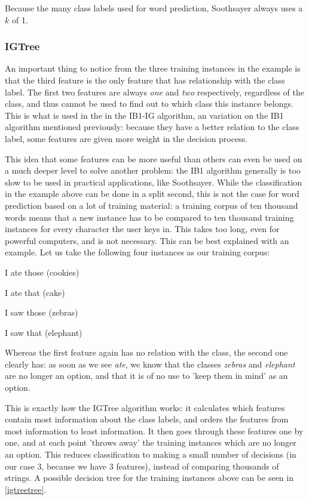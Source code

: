 \documentclass[12pt]{article}
\begin{document}
Because the many class labels used for word prediction, Soothsayer always uses a $k$ of 1.

\subsubsection{IGTree}

An important thing to notice from the three training instances in the example is that the third feature is the only feature that has relationship with the class label. The first two features are always \emph{one} and \emph{two} respectively, regardless of the class, and thus cannot be used to find out to which class this instance belongs. This is what is used in the in the IB1-IG algorithm, an variation on the IB1 algorithm mentioned previously: because they have a better relation to the class label, some features are given more weight in the decision process.

This idea that some features can be more useful than others can even be used on a much deeper level to solve another problem: the IB1 algorithm generally is too slow to be used in practical applications, like Soothsayer. While the classification in the example above can be done in a split second, this is not the case for word prediction based on a lot of training material: a training corpus of ten thousand words means that a new instance has to be compared to ten thousand training instances for every character the user keys in. This takes too long, even for powerful computers, and is not necessary. This can be best explained with an example. Let us take the following four instances as our training corpus:

\begin{examples}
\item I ate those (cookies)
\item I ate that (cake)
\item I saw those (zebras)
\item I saw that (elephant)
\end{examples}

Whereas the first feature again has no relation with the class, the second one clearly has: as soon as we see \emph{ate}, we know that the classes \emph{zebras} and \emph{elephant} are no longer an option, and that it is of no use to 'keep them in mind' as an option.

This is exactly how the IGTree algorithm \cite{daelemans+97} works: it calculates which features contain most information about the class labels, and orders the features from most information to least information. It then goes through these features one by one, and at each point 'throws away' the training instances which are no longer an option. This reduces classification to making a small number of decisions (in our case 3, because we have 3 features), instead of comparing thousands of strings. A possible decision tree for the training instances above can be seen in \ref{igtreetree}.
\end{document}
